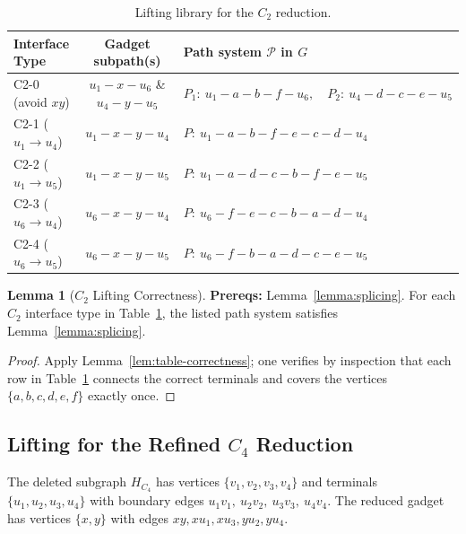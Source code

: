 \documentclass[12pt]{article}
\theoremstyle{definition}
\newtheorem{lemma}[theorem]{Lemma}
\begin{document}
\begin{table}[ht]
\centering
\begin{center}
\small
\begin{tabularx}{\textwidth}{|l|c|X|}
\hline
\textbf{Interface Type} &
\textbf{Gadget subpath(s)} &
\textbf{Path system $\mathcal{P}$ in $G$} \\
\hline
C2-0 (avoid $xy$) &
$u_1\!-\!x\!-\!u_6$ \& $u_4\!-\!y\!-\!u_5$ &
$P_1:\ u_1\!-\!a\!-\!b\!-\!f\!-\!u_6,\quad P_2:\ u_4\!-\!d\!-\!c\!-\!e\!-\!u_5$\\
\hline
C2-1 ($u_1 \to u_4$) &
$u_1\!-\!x\!-\!y\!-\!u_4$ &
$P:\ u_1\!-\!a\!-\!b\!-\!f\!-\!e\!-\!c\!-\!d\!-\!u_4$\\
\hline
C2-2 ($u_1 \to u_5$) &
$u_1\!-\!x\!-\!y\!-\!u_5$ &
$P:\ u_1\!-\!a\!-\!d\!-\!c\!-\!b\!-\!f\!-\!e\!-\!u_5$\\
\hline
C2-3 ($u_6 \to u_4$) &
$u_6\!-\!x\!-\!y\!-\!u_4$ &
$P:\ u_6\!-\!f\!-\!e\!-\!c\!-\!b\!-\!a\!-\!d\!-\!u_4$\\
\hline
C2-4 ($u_6 \to u_5$) &
$u_6\!-\!x\!-\!y\!-\!u_5$ &
$P:\ u_6\!-\!f\!-\!b\!-\!a\!-\!d\!-\!c\!-\!e\!-\!u_5$\\
\hline
\end{tabularx}
\end{center}
\caption{Lifting library for the $C_2$ reduction.}
\label{tab:lifting-c2}
\end{table}

\begin{lemma}[$C_2$ Lifting Correctness]
\label{lem:lifting-c2}
\label{lemma:c2-lifting}
\textbf{Prereqs:} Lemma~\ref{lemma:splicing}.
For each $C_2$ interface type in Table~\ref{tab:lifting-c2}, the listed path system
satisfies Lemma~\ref{lemma:splicing}.
\end{lemma}

\begin{proof}
Apply Lemma~\ref{lem:table-correctness}; one verifies by inspection that each row in Table~\ref{tab:lifting-c2} connects the correct terminals and covers the vertices $\{a,b,c,d,e,f\}$ exactly once.
\end{proof}


\subsection{Lifting for the Refined $C_4$ Reduction}
\label{subsec:lifting-c4}

The deleted subgraph $H_{C_4}$ has vertices $\{v_1,v_2,v_3,v_4\}$ and terminals
$\{u_1,u_2,u_3,u_4\}$ with boundary edges
$u_1v_1,\ u_2v_2,\ u_3v_3,\ u_4v_4$.
The reduced gadget has vertices $\{x,y\}$ with edges $xy, xu_1, xu_3, yu_2, yu_4$.
\end{document}
